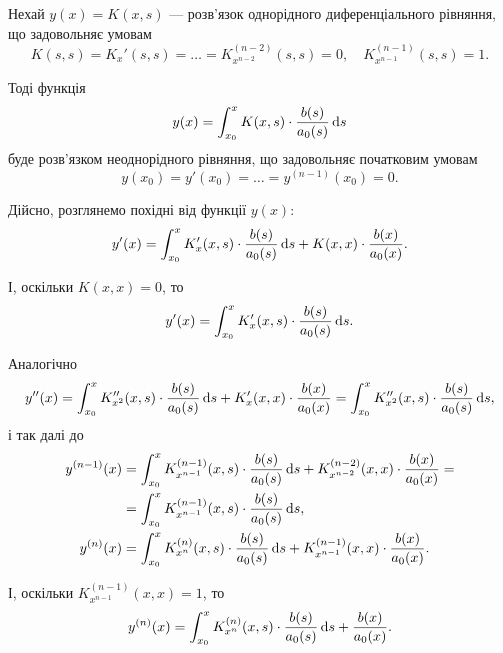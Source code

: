 Нехай $y(x) = K(x, s)$ --- розв’язок однорідного диференціального рівняння, що задовольняє умовам
\begin{equation*}
	K(s, s) = K_x'(s, s) = \ldots = K_{x^{n - 2}}^{(n - 2)}(s, s) = 0, \quad K_{x^{n - 1}}^{(n - 1)}(s, s) = 1.
\end{equation*}

Тоді функція
\begin{equation*}
	y(x) = \int_{x_0}^x K(x, s) \cdot \frac{b(s)}{a_0(s)} \mathop{}\!\mathrm{d} s
\end{equation*}
буде розв’язком неоднорідного рівняння, що задовольняє початковим умовам
\begin{equation*}
	y(x_0) = y'(x_0) = \ldots = y^{(n - 1)}(x_0) = 0.
\end{equation*}

Дійсно, розглянемо похідні від функції $y(x)$:
\begin{equation*}
	y'(x) = \int_{x_0}^x K_x'(x, s) \cdot \frac{b(s)}{a_0(s)} \mathop{}\!\mathrm{d} s + K(x, x) \cdot \frac{b(x)}{a_0(x)}.
\end{equation*}

І, оскільки $K(x, x) = 0$, то
\begin{equation*}
	y'(x) = \int_{x_0}^x K_x'(x, s) \cdot \frac{b(s)}{a_0(s)} \mathop{}\!\mathrm{d} s.
\end{equation*}

Аналогічно
\begin{equation*}
	y''(x) = \int_{x_0}^x K_{x^2}''(x, s) \cdot \frac{b(s)}{a_0(s)} \mathop{}\!\mathrm{d} s + K_x'(x, x) \cdot \frac{b(x)}{a_0(x)} = \int_{x_0}^x K_{x^2}''(x, s) \cdot \frac{b(s)}{a_0(s)} \mathop{}\!\mathrm{d} s,
\end{equation*}
і так далі до
\begin{align*}
	y^{(n - 1)}(x) &= \int_{x_0}^x K_{x^{n - 1}}^{(n - 1)}(x, s) \cdot \frac{b(s)}{a_0(s)} \mathop{}\!\mathrm{d} s + K_{x^{n - 2}}^{(n - 2)}(x, x) \cdot \frac{b(x)}{a_0(x)} = \\ &= \int_{x_0}^x K_{x^{n - 1}}^{(n - 1)}(x, s) \cdot \frac{b(s)}{a_0(s)} \mathop{}\!\mathrm{d} s, \\
	y^{(n)}(x) &= \int_{x_0}^x K_{x^n}^{(n)}(x, s) \cdot \frac{b(s)}{a_0(s)} \mathop{}\!\mathrm{d} s + K_{x^{n - 1}}^{(n - 1)}(x, x) \cdot \frac{b(x)}{a_0(x)}.
\end{align*}

І, оскільки $K_{x^{n - 1}}^{(n - 1)}(x, x) = 1$, то
\begin{equation*}
	y^{(n)}(x) = \int_{x_0}^x K_{x^n}^{(n)}(x, s) \cdot \frac{b(s)}{a_0(s)} \mathop{}\!\mathrm{d} s + \frac{b(x)}{a_0(x)}.
\end{equation*}

